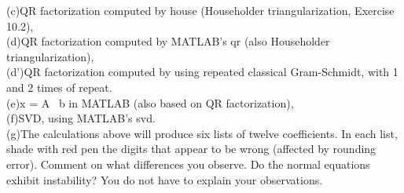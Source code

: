 \documentclass[11pt]{article}
\begin{document}
(c)QR factorization computed by house (Householder triangularization, Exercise 10.2),\\

(d)QR factorization computed by MATLAB's qr (also Householder triangularization),\\

(d')QR factorization computed by using repeated classical Gram-Schmidt, with 1 and 2 times of repeat.\\

(e)x = A \ b in MATLAB (also based on QR factorization),\\

(f)SVD, using MATLAB's svd.\\

(g)The calculations above will produce six lists of twelve coefficients. In each list, shade with red pen the digits that appear to be wrong (affected by rounding error). Comment on what differences you observe. Do the normal equations exhibit instability? You do not have to explain your observations.\\
\end{document}
